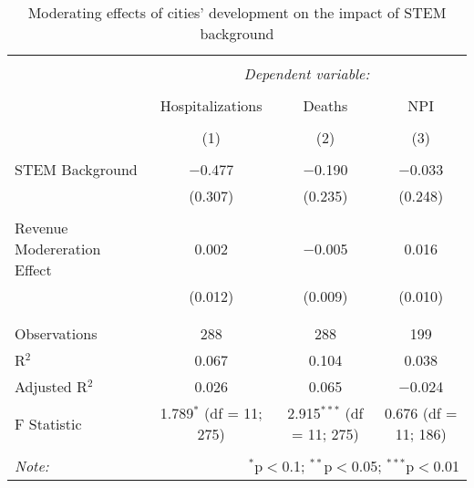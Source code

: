
\begin{table}[!htbp] \centering 
  \caption{Moderating effects of cities’ development on the impact of STEM background} 
  \label{} 
\begin{tabular}{@{\extracolsep{5pt}}lccc} 
\\[-1.8ex]\hline 
\hline \\[-1.8ex] 
 & \multicolumn{3}{c}{\textit{Dependent variable:}} \\ 
\cline{2-4} 
\\[-1.8ex] & Hospitalizations & Deaths & NPI \\ 
\\[-1.8ex] & (1) & (2) & (3)\\ 
\hline \\[-1.8ex] 
 STEM Background & $-$0.477 & $-$0.190 & $-$0.033 \\ 
  & (0.307) & (0.235) & (0.248) \\ 
  & & & \\ 
 Revenue Modereration Effect & 0.002 & $-$0.005 & 0.016 \\ 
  & (0.012) & (0.009) & (0.010) \\ 
  & & & \\ 
\hline \\[-1.8ex] 
Observations & 288 & 288 & 199 \\ 
R$^{2}$ & 0.067 & 0.104 & 0.038 \\ 
Adjusted R$^{2}$ & 0.026 & 0.065 & $-$0.024 \\ 
F Statistic & 1.789$^{*}$ (df = 11; 275) & 2.915$^{***}$ (df = 11; 275) & 0.676 (df = 11; 186) \\ 
\hline 
\hline \\[-1.8ex] 
\textit{Note:}  & \multicolumn{3}{r}{$^{*}$p$<$0.1; $^{**}$p$<$0.05; $^{***}$p$<$0.01} \\ 
\end{tabular} 
\end{table} 
